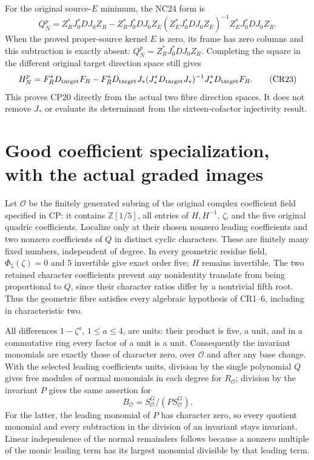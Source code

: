 \documentclass[11pt]{article}
\begin{document}
For the original source-$E$ minimum, the NC24 form is
\[
 Q_N^p=Z_R^*J_0^*DJ_0Z_R
 -Z_R^*J_0^*DJ_0Z_E(Z_E^*J_0^*DJ_0Z_E)^{-1}Z_E^*J_0^*DJ_0Z_R.
\]
When the proved proper-source kernel $E$ is zero, its frame has
zero columns and this subtraction is exactly absent:
$Q_N^p=Z_R^*J_0^*DJ_0Z_R$.  Completing the square in the
different original target direction space still gives
\[
 H_N^p=F_R^*D_{\rm target}F_R
 -F_R^*D_{\rm target}J_*(J_*^*D_{\rm target}J_*)^{-1}
                         J_*^*D_{\rm target}F_R.                 \tag{CR23}
\]
This proves CP20 directly from the actual two fibre direction
spaces.  It does not remove $J_*$ or evaluate its determinant
from the sixteen-cofactor injectivity result.

\section{Good coefficient specialization, with the actual graded images}
Let $\mathcal O$ be the finitely generated subring of the original
complex coefficient field specified in CP: it contains
$\mathbb Z[1/5]$, all entries of $H,H^{-1}$, $\zeta$, and the
five original quadric coefficients.  Localize only at their chosen
nonzero leading coefficients and two nonzero coefficients of $Q$
in distinct cyclic characters.  These are finitely many fixed
numbers, independent of degree.  In every geometric residue
field, $\Phi_5(\zeta)=0$ and $5$ invertible give exact order five;
$H$ remains invertible.  The two retained character coefficients
prevent any nonidentity translate from being proportional to $Q$,
since their character ratios differ by a nontrivial fifth root.
Thus the geometric fibre satisfies every algebraic hypothesis of
CR1--6, including in characteristic two.

All differences $1-\zeta^a$, $1\le a\le4$, are units: their
product is five, a unit, and in a commutative ring every factor
of a unit is a unit.  Consequently the invariant monomials are
exactly those of character zero, over $\mathcal O$ and after any
base change.  With the selected leading coefficients units,
division by the single polynomial $Q$ gives free modules of
normal monomials in each degree for $R_\mathcal O$; division by
the invariant $P$ gives the same assertion for
\[
 B_\mathcal O=S_\mathcal O^G/(P S_\mathcal O^G).
\]
For the latter, the leading monomial of $P$ has character zero,
so every quotient monomial and every subtraction in the division
of an invariant stays invariant.  Linear independence of the
normal remainders follows because a nonzero multiple of the
monic leading term has its largest monomial divisible by that
leading term.
\end{document}
